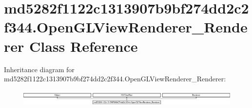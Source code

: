 \hypertarget{classmd5282f1122c1313907b9bf274dd2c2f344_1_1OpenGLViewRenderer__Renderer}{}\section{md5282f1122c1313907b9bf274dd2c2f344.\+Open\+G\+L\+View\+Renderer\+\_\+\+Renderer Class Reference}
\label{classmd5282f1122c1313907b9bf274dd2c2f344_1_1OpenGLViewRenderer__Renderer}
Inheritance diagram for md5282f1122c1313907b9bf274dd2c2f344.\+Open\+G\+L\+View\+Renderer\+\_\+\+Renderer\+:\begin{figure}[H]
\begin{center}
\leavevmode
\includegraphics[height=0.829630cm]{classmd5282f1122c1313907b9bf274dd2c2f344_1_1OpenGLViewRenderer__Renderer}
\end{center}
\end{figure}
